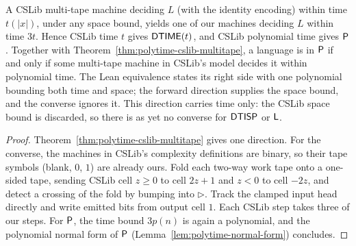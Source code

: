\begin{theorem}
  \label{thm:polytime-cslib-P-eq}
  \leanok
  A CSLib multi-tape machine deciding $L$ (with the identity encoding) within
  time $t(|x|)$, under any space bound, yields one of our machines deciding $L$
  within time $3t$.
  Hence CSLib time $t$ gives $\mathsf{DTIME}(t)$, and CSLib polynomial time gives
  $\mathsf{P}$. Together with Theorem~\ref{thm:polytime-cslib-multitape}, a
  language is in $\mathsf{P}$ if and only if some multi-tape machine in CSLib's
  model decides it within polynomial time. The Lean equivalence states its
  right side with one polynomial bounding both time and space; the forward
  direction supplies the space bound, and the converse ignores it. This
  direction carries time only: the CSLib space bound is discarded, so there is
  as yet no converse for $\mathsf{DTISP}$ or $\mathsf{L}$.
\end{theorem}
\begin{proof}
  \leanok
  Theorem~\ref{thm:polytime-cslib-multitape} gives one direction. For the
  converse, the machines in CSLib's complexity definitions are binary, so
  their tape symbols (blank, $0$, $1$) are already ours. Fold each two-way
  work tape onto a one-sided tape,
  sending CSLib cell $z \ge 0$ to cell $2z + 1$ and $z < 0$ to cell $-2z$, and
  detect a crossing of the fold by bumping into $\triangleright$. Track the
  clamped input head directly and write emitted bits from output cell $1$.
  Each CSLib step takes three of our steps. For $\mathsf{P}$, the time bound
  $3p(n)$ is again a polynomial, and the polynomial normal form of
  $\mathsf{P}$ (Lemma~\ref{lem:polytime-normal-form}) concludes.
\end{proof}

